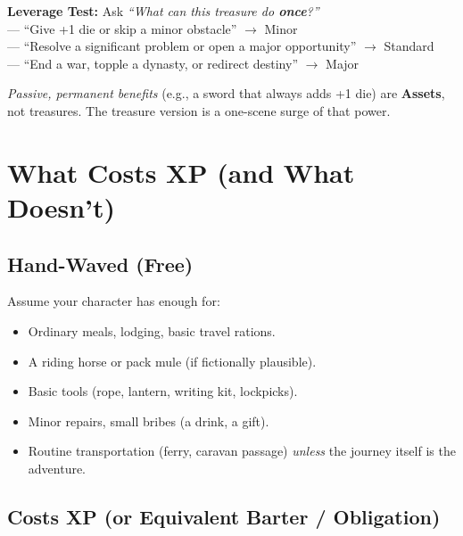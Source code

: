 \begin{tcolorbox}[colback=yellow!5!white,colframe=yellow!70!black,title=Abstracted Treasure: The Leverage Standard,breakable]
  \vspace{2mm}
  \noindent
  \textbf{Leverage Test:} Ask \emph{``What can this treasure do \textbf{once}?''} \\
  \quad --- ``Give +1 die or skip a minor obstacle'' $\rightarrow$ Minor \\
  \quad --- ``Resolve a significant problem or open a major opportunity'' $\rightarrow$ Standard \\
  \quad --- ``End a war, topple a dynasty, or redirect destiny'' $\rightarrow$ Major

  \vspace{1mm}
  \noindent
  \textit{Passive, permanent benefits} (e.g., a sword that always adds +1 die) are \textbf{Assets}, not treasures. The treasure version is a one-scene surge of that power.
\end{tcolorbox}

\section{What Costs XP (and What Doesn't)}
\label{sec:xp-costs-table}

\subsection{Hand-Waved (Free)}
\label{subsec:handwaved}

Assume your character has enough for:
\begin{itemize}
  \item Ordinary meals, lodging, basic travel rations.
  \item A riding horse or pack mule (if fictionally plausible).
  \item Basic tools (rope, lantern, writing kit, lockpicks).
  \item Minor repairs, small bribes (a drink, a gift).
  \item Routine transportation (ferry, caravan passage) \emph{unless} the journey itself is the adventure.
\end{itemize}

\subsection{Costs XP (or Equivalent Barter / Obligation)}
\label{subsec:xp-cost-items}

